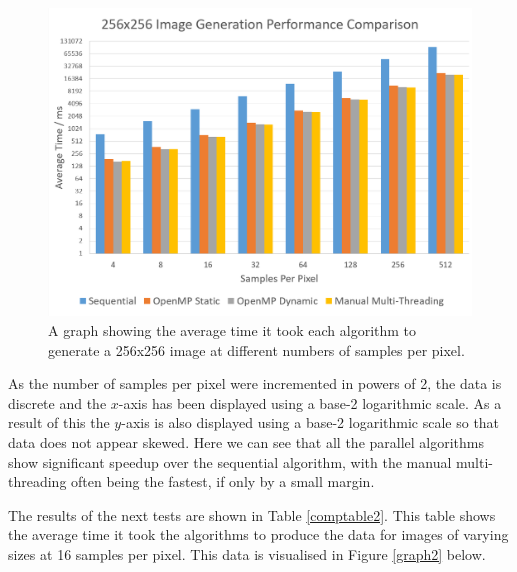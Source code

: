 \documentclass[12pt,journal,transmag]{IEEEtran}
\begin{document}
	\begin{figure}[!h]
		\centering
		\includegraphics[width=\textwidth]{IMAGES/performancecomparison1}
		\caption{A graph showing the average time it took each algorithm to generate a 256x256 image at different numbers of samples per pixel.}
		\label{graph1}
	\end{figure}
	
	As the number of samples per pixel were incremented in powers of 2, the data is discrete and the $x$-axis has been displayed using a base-2 logarithmic scale. As a result of this the $y$-axis is also displayed using a base-2 logarithmic scale so that data does not appear skewed. Here we can see that all the parallel algorithms show significant speedup over the sequential algorithm, with the manual multi-threading often being the fastest, if only by a small margin.
	
	The results of the next tests are shown in Table \ref{comptable2}. This table shows the average time it took the algorithms to produce the data for images of varying sizes at 16 samples per pixel. This data is visualised in Figure \ref{graph2} below.
\end{document}
